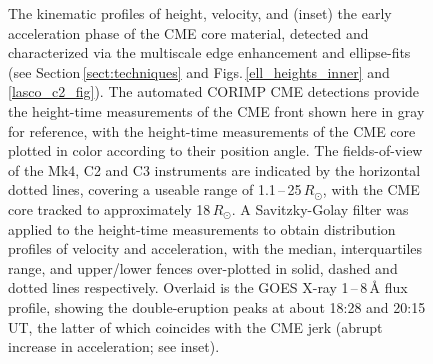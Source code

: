 \documentclass[namedreferences]{solarphysics}
\begin{document}
\begin{article}
\begin{figure}[!t]
\caption{The kinematic profiles of height, velocity, and (inset) the early acceleration phase of the CME core material, detected and characterized via the multiscale edge enhancement and ellipse-fits (see Section\,\ref{sect:techniques} and Figs.\,\ref{ell_heights_inner} and \ref{lasco_c2_fig}). The automated CORIMP CME detections provide the height-time measurements of the CME front shown here in gray for reference, with the height-time measurements of the CME core  plotted in color according to their position angle. The fields-of-view of the Mk4, C2 and C3 instruments are indicated by the horizontal dotted lines, covering a useable range of 1.1\,--\,25\,$R_{\odot}$, with the CME core tracked to approximately 18\,$R_{\odot}$. A Savitzky-Golay filter was applied to the height-time measurements to obtain distribution profiles of velocity and acceleration, with the median, interquartiles range, and upper/lower fences over-plotted in solid, dashed and dotted lines respectively. Overlaid is the GOES X-ray 1\,--\,8\,{\AA} flux profile, showing the double-eruption peaks at about 18:28 and 20:15\,UT, the latter of which coincides with the CME jerk (abrupt increase in acceleration; see inset).}
\label{kins_CMEcore}
\end{figure}


\end{article}
\end{document}

